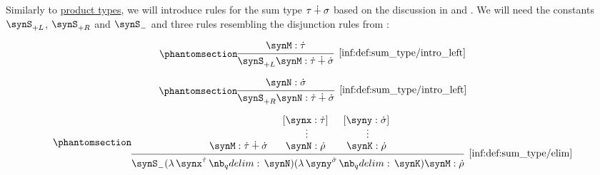 \begin{definition}\label{def:sum_type}\mimprovised
  Similarly to \hyperref[def:product_type]{product types}, we will introduce rules for the sum type \( \tau \mathbin{\dotplus} \sigma \) based on the discussion in  and . We will need the constants \( \synS_{+L} \), \( \synS_{+R} \) and \( \synS_- \) and three rules resembling the disjunction rules from :
  \begin{paracol}{3}
    \begin{nthcolumn}{0}
      \ParacolAlignmentHack
      \begin{equation*}\taglabel[\ensuremath{ +_{+L} }]{inf:def:sum_type/intro_left}
        \begin{prooftree}
          \hypo{ \synM: \syn\tau }
          \infer1[\ref{inf:def:sum_type/intro_left}]{ \synS_{+L} \synM: \syn\tau \synplus \syn\sigma }
        \end{prooftree}
      \end{equation*}
    \end{nthcolumn}

    \begin{nthcolumn}{1}
      \ParacolAlignmentHack
      \begin{equation*}\taglabel[\ensuremath{ +_{+R} }]{inf:def:sum_type/intro_right}
        \begin{prooftree}
          \hypo{ \synN: \syn\sigma }
          \infer1[\ref{inf:def:sum_type/intro_left}]{ \synS_{+R} \synN: \syn\tau \synplus \syn\sigma }
        \end{prooftree}
      \end{equation*}
    \end{nthcolumn}

    \begin{nthcolumn}{2}
      \ParacolAlignmentHack
      \begin{equation*}\taglabel[\ensuremath{ +_- }]{inf:def:sum_type/elim}
        \begin{prooftree}
          \hypo{ \synM: \syn\tau \synplus \syn\sigma }
          \hypo{ [\synx: \syn\tau] }
          \ellipsis {} { \synN: \syn\rho }
          \hypo{ [\syny: \syn\sigma] }
          \ellipsis {} { \synK: \syn\rho }
          \infer3[\ref{inf:def:sum_type/elim}]{ \synS_- (\qabs {\synx^{\syn\tau}} \synN) (\qabs {\syny^{\syn\sigma}} \synK) \synM: \syn\rho }
        \end{prooftree}
      \end{equation*}
    \end{nthcolumn}
  \end{paracol}
  \columnratio{}
\end{definition}
